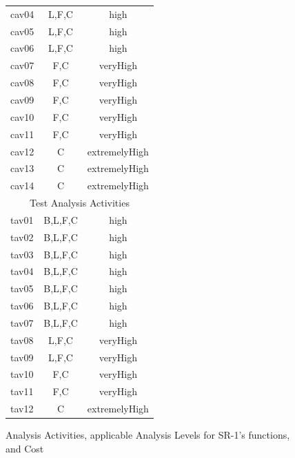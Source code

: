 \documentclass[twocolumn]{styles/IEEEtran}
\begin{document}
\begin{figure}[h]
\begin{footnotesize}
\begin{center}
\begin{tabular}[t]{|l|c|c|}
cav04	&L,F,C	&high\\
cav05	&L,F,C	&high\\
cav06	&L,F,C	&high\\
cav07	&F,C	&veryHigh\\
cav08	&F,C	&veryHigh\\
cav09	&F,C	&veryHigh\\
cav10	&F,C	&veryHigh\\
cav11	&F,C	&veryHigh\\
cav12	&C	&extremelyHigh\\
cav13	&C	&extremelyHigh\\
cav14	&C	&extremelyHigh\\ \hline
 \multicolumn{3}{|c|}{Test Analysis Activities} \\ \hline
tav01	&B,L,F,C	&high\\
tav02	&B,L,F,C	&high\\
tav03	&B,L,F,C	&high\\
tav04	&B,L,F,C	&high\\
tav05	&B,L,F,C	&high\\
tav06	&B,L,F,C	&high\\
tav07	&B,L,F,C	&high\\
tav08	&L,F,C	&veryHigh\\
tav09	&L,F,C	&veryHigh\\
tav10	&F,C	&veryHigh\\
tav11	&F,C	&veryHigh\\
tav12	&C	&extremelyHigh\\ \hline
 \end{tabular}
 \end{center}
 \end{footnotesize}
 \caption{Analysis Activities, applicable Analysis Levels for SR-1's functions, and Cost}
 \label{fig:analysis_acivities}

\end{figure}

\newpage
\end{document}
